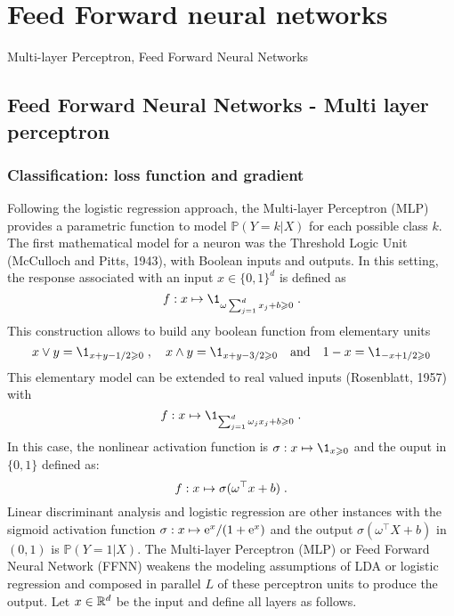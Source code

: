 \chapter{Feed Forward neural networks}
\minitoc
\begin{kwd}
Multi-layer Perceptron, Feed Forward Neural Networks
\end{kwd}



\section{Feed Forward Neural Networks - Multi layer perceptron} 
\subsection{Classification: loss function and gradient}
Following the logistic regression approach, the Multi-layer Perceptron (MLP) provides a parametric function to model $\mathbb{P}(Y=k | X)$ for each possible class $k$.
The first  mathematical model for a neuron was the Threshold Logic Unit (McCulloch and Pitts, 1943), with Boolean inputs and outputs. In this setting, the response associated with an input $x\in\{0,1\}^d$ is defined as 
$$
f: x\mapsto \1_{\omega\sum_{j=1}^dx_j + b \geqslant 0}\eqsp.
$$ 
This construction allows to build any boolean function from elementary units
\[
x\vee y = \1_{x+y-1/2 \geqslant 0}\eqsp,\quad x\wedge y = \1_{x+y-3/2 \geqslant 0}\quad\mathrm{and}\quad  1-x = \1_{-x+1/2 \geqslant 0}
\] 
This elementary model can be extended to real valued inputs (Rosenblatt, 1957) with 
$$
f: x\mapsto \1_{\sum_{j=1}^d\omega_jx_j + b \geqslant 0}\eqsp.
$$
In this case, the nonlinear activation function is $\sigma: x \mapsto \1_{x\geqslant 0}$ and the ouput in $\{0,1\}$ defined as:
\[
f:x \mapsto \sigma(\omega^\top x + b)\;.
\]
Linear discriminant analysis and logistic regression are other instances with the sigmoid activation function $\sigma: x\mapsto \mathrm{e}^x/(1+\mathrm{e}^x)$ and the output $ \sigma(\omega^\top X + b)$ in $(0,1)$ is $\mathbb{P}(Y=1 | X)$.
The Multi-layer Perceptron (MLP) or Feed Forward Neural Network (FFNN) weakens the modeling assumptions of LDA or logistic regression and composed in parallel  $L$ of these perceptron units to produce the output. Let $x\in\mathbb{R}^d$ be the input and define all layers as follows.
